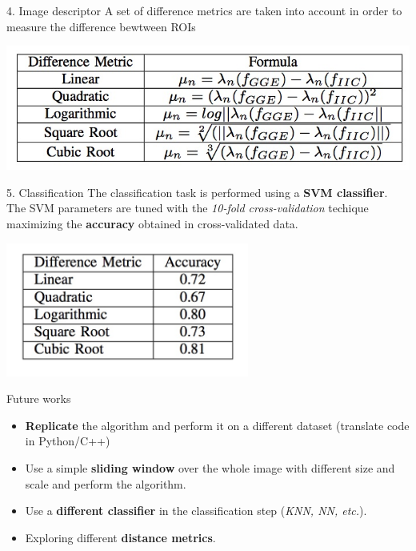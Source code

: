 \begin{tframe}{4. Image descriptor}
A set of difference metrics are taken into account in order to measure the difference bewtween ROIs
\vspace{0.2cm}
\begin{center}
\includegraphics[width=1\textwidth]{images/metrics.jpg}
\end{center}
\end{tframe}

\begin{tframe}{5. Classification}
The classification task is performed using a \textbf{SVM classifier}. The SVM parameters are tuned with the \emph{10-fold cross-validation} techique maximizing the \textbf{accuracy} obtained in cross-validated data.

\vspace{0.2cm}

\begin{center}
\includegraphics[width=0.6\textwidth]{images/results.jpg}
\end{center}

\end{tframe}

\begin{tframe}{Future works}
\begin{itemize}
\vspace{0.2cm}
\item \textbf{Replicate} the algorithm and perform it on a different dataset (translate code in Python/C++)
\vspace{0.2cm}
\item Use a simple \textbf{sliding window} over the whole image with different size and scale and perform the algorithm.
\vspace{0.2cm}
\item Use a \textbf{different classifier} in the classification step (\emph{KNN, NN, etc.}).
\vspace{0.2cm}
\item Exploring different \textbf{distance metrics}.
\end{itemize}
\end{tframe}



